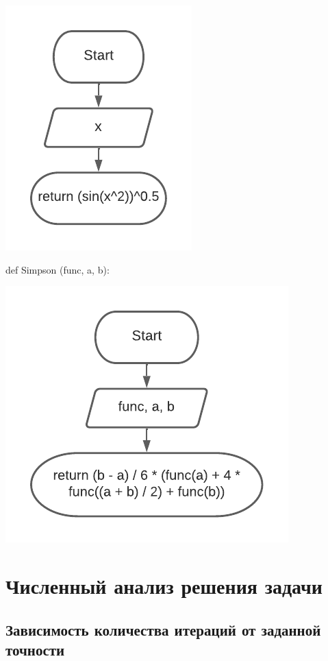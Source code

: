 \includegraphics[scale=0.75]{block1.pdf}

def Simpson (func, a, b):

\includegraphics[scale=0.75]{block2.pdf}


\section{Численный анализ решения задачи}


\subsection{Зависимость количества итераций от заданной точности}

